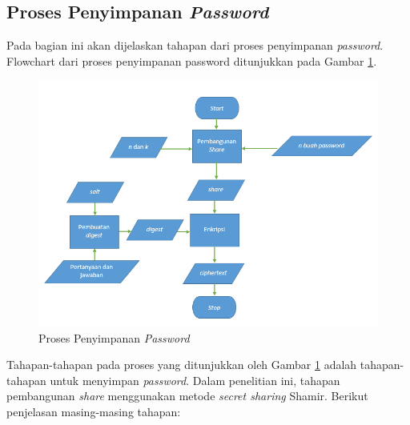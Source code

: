 \subsection{Proses Penyimpanan \textit{Password}}

Pada bagian ini akan dijelaskan tahapan dari proses penyimpanan \textit{password}. Flowchart dari proses penyimpanan password ditunjukkan pada Gambar \ref{fig:create_share}.

\begin{figure}[H]
	\centerline{\includegraphics[scale=0.7]{Gambar/flowchart_share}}
	\caption{Proses Penyimpanan \textit{Password}}\label{fig:create_share}
\end{figure}

Tahapan-tahapan pada proses yang ditunjukkan oleh Gambar \ref{fig:create_share} adalah tahapan-tahapan untuk menyimpan \textit{password}. Dalam penelitian ini, tahapan pembangunan \textit{share} menggunakan metode \textit{secret sharing} Shamir. Berikut penjelasan masing-masing tahapan:

